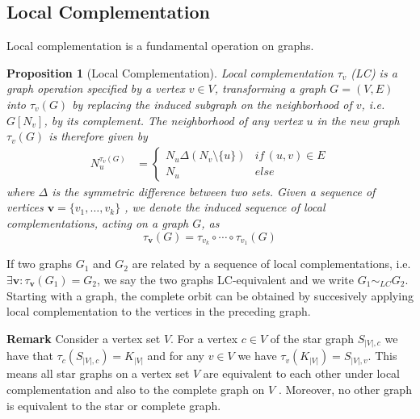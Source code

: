\documentclass[10pt,a4paper]{book}
\numberwithin{equation}{chapter}
\numberwithin{figure}{chapter}
\numberwithin{table}{chapter}
\newtheorem{prop}{Proposition}[section]
\begin{document}
\subsection{Local Complementation}
Local complementation is a fundamental operation on graphs.
\begin{prop}[Local Complementation] Local complementation $\tau_v$ (LC) is a graph operation specified by a vertex $v\in V$, transforming a graph $G=(V,E)$ into $\tau_{v}(G)$ by replacing the induced subgraph on the neighborhood of $v$, i.e. $G[N_v]$, by its complement.
The neighborhood of any vertex $u$ in the new graph $\tau_{v}(G)$ is therefore given by
\begin{align}
N^{\tau_{v}(G)}_{u} &= \left\lbrace \begin{array}{cc} N_{u}\Delta (N_{v}\setminus \lbrace u \rbrace) & if \, (u,v)\in E \\ N_u & else \end{array}
\end{align}
where $\Delta$ is the symmetric difference between two sets. Given a sequence of vertices $\textbf{v} =\lbrace v_{1},\ldots , v_{k}\rbrace$ , we denote the induced sequence of local complementations, acting on a graph $G$, as
\begin{equation}
\tau_{\textbf{v}}(G)=\tau_{v_k}\circ \cdots \circ \tau_{v_1}(G)
\end{equation}
\label{LComplementation} 
\end{prop}
If two graphs $G_1$ and $G_2$ are related by a sequence of local complementations, i.e. $\exists \textbf{v} : \tau_{\textbf{v}}(G_1)=G_2$, we say the two graphs LC-equivalent and we write $G_{1}\sim_{LC} G_2$. Starting with a graph, the complete orbit can be obtained by succesively applying local complementation to the vertices in the preceding graph.

\textbf{Remark} Consider a vertex set $V$. For a vertex $c\in V$ of the star graph $S_{|V|,c}$ we have that $\tau_{c}(S_{|V|,c})=K_{|V|}$ and for any $v\in V$ we have $\tau_{v}(K_{|V|})=S_{|V|,v}$. This means all star graphs on a vertex set $V$ are equivalent to each other under local complementation and also to the complete graph on $V$ . Moreover, no other graph is equivalent to the star or complete graph.
\end{document}
